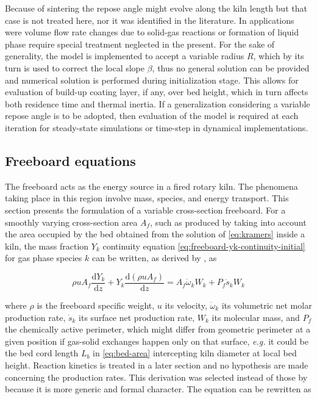 \documentclass[11pt]{paper}
\begin{document}
Because of sintering the repose angle might evolve along the kiln length but that case is not treated here, nor it was identified in the literature.  In applications were volume flow rate changes due to solid-gas reactions or formation of liquid phase require special treatment neglected in the present. For the sake of generality, the model is implemented to accept a variable radius $R$, which by its turn is used to correct the local slope $\beta$, thus no general solution can be provided and numerical solution is performed during initialization stage. This allows for evaluation of build-up coating layer, if any, over bed height, which in turn affects both residence time and thermal inertia. If a generalization considering a variable repose angle is to be adopted, then evaluation of the model is required at each iteration for steady-state simulations or time-step in dynamical implementations.

\subsection{Freeboard equations}

The freeboard acts as the energy source in a fired rotary kiln. The phenomena taking place in this region involve mass, species, and energy transport. This section presents the formulation of a variable cross-section freeboard. For a smoothly varying cross-section area $A_{f}$, such as produced by taking into account the area occupied by the bed obtained from the solution of \eqref{eq:kramers} inside a kiln, the mass fraction $Y_{k}$ continuity equation \eqref{eq:freeboard-yk-continuity-initial} for gas phase species $k$ can be written, as derived by \textcite{Kee2017}, as

\begin{equation}
\rho{}uA_{f}\frac{\mathrm{d}Y_{k}}{\mathrm{d}z}+
Y_{k}\frac{\mathrm{d}(\rho{}uA_{f})}{\mathrm{d}z}=
A_{f}\dot{\omega}_{k}W_{k}+
P_{f}\dot{s}_{k}W_{k}
\label{eq:freeboard-yk-continuity-initial}
\end{equation}

\noindent{}where $\rho$ is the freeboard specific weight, $u$ its velocity, $\dot{\omega}_{k}$ its volumetric net molar production rate, $\dot{s}_{k}$ its surface net production rate,  $W_{k}$ its molecular mass, and $P_{f}$ the chemically active perimeter, which might differ from geometric perimeter at a given position if gas-solid exchanges happen only on that surface, \emph{e.g.} it could be the bed cord length $L_{b}$ in \eqref{eq:bed-area} intercepting kiln diameter at local bed height. Reaction kinetics is treated in a later section and no hypothesis are made concerning the production rates. This derivation was selected instead of those by \textcite{Mujumdar2006i} because it is more generic and formal character. The equation can be rewritten as
\end{document}
